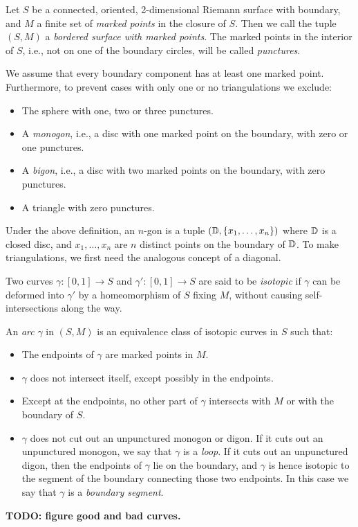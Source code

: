 \begin{definition}

	Let $S$ be a connected, oriented, 2-dimensional Riemann surface with boundary, and $M$
	a finite set of \emph{marked points} in the closure of $S$. Then we
	call the tuple $(S, M)$ a \emph{bordered surface with marked
		points}. The marked points in the interior of $S$,
	i.e., not on one of the boundary circles, will be called
	\emph{punctures}.

	We assume that every boundary component has at least one marked point. Furthermore, to
	prevent cases with only one or no triangulations we exclude:
	\begin{itemize}
		\item The sphere with one, two or three punctures.
		\item A \emph{monogon}, i.e., a disc with one marked point on the boundary,
		      with zero or one punctures.
		\item A \emph{bigon}, i.e., a disc with two marked points on the boundary, with
		      zero punctures.
		\item A triangle with zero punctures.
	\end{itemize}
\end{definition}

Under the above definition, an $n$-gon is a tuple $(\mathbb{D}, \{x_1, \dotsc, x_n\})$ where
$\mathbb{D}$ is a closed disc, and $x_1, \dotsc, x_n$ are $n$ distinct points on the boundary
of $\mathbb{D}$. To make triangulations, we first need the analogous concept of a diagonal.

\begin{definition}

	Two curves $\gamma \colon [0,1] \to S$ and $\gamma' \colon [0,1] \to S$ are said to be
	\emph{isotopic} if $\gamma$ can be deformed into $\gamma'$ by a
	homeomorphism of $S$ fixing $M$, without causing self-intersections along the way.

	An \emph{arc} $\gamma$ in $(S, M)$ is an equivalence class of isotopic
	curves in $S$ such that:
	\begin{itemize}
		\item The endpoints of $\gamma$ are marked points in $M$.
		\item $\gamma$ does not intersect itself, except possibly in the endpoints.
		\item Except at the endpoints, no other part of $\gamma$ intersects with $M$ or with the
		      boundary of $S$.
		\item $\gamma$ does not cut out an unpunctured monogon or digon. If it cuts out an unpunctured monogon, we say that $\gamma$ is a \emph{loop}. If it cuts out an unpunctured digon, then the endpoints of $\gamma$ lie on the boundary, and $\gamma$ is hence isotopic to the segment of the boundary connecting those two endpoints. In this case we say that $\gamma$ is a \emph{boundary segment}.
	\end{itemize}
	\textbf{TODO: figure good and bad curves.}
\end{definition}

